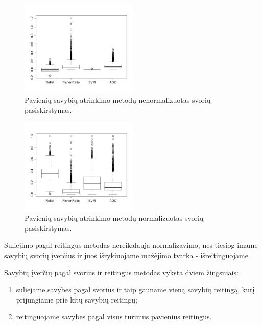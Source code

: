 \begin{figure}[htb]
\begin{center}
\leavevmode
\includegraphics[width=0.5\textwidth]{images/boxplot_colon_all.png}
\end{center}
\caption{Pavienių savybių atrinkimo metodų nenormalizuotas svorių
pasiskirstymas.}
\label{fig:flash}
\end{figure}

\begin{figure}[htb]
\begin{center}
\leavevmode
\includegraphics[width=0.5\textwidth]{images/boxplot_colon_all_normalized.png}
\end{center}
\caption{Pavienių savybių atrinkimo metodų normalizuotas svorių
pasiskirstymas.}
\label{fig:flash}
\end{figure}

Suliejimo pagal reitingus metodas nereikalauja normalizavimo, nes tiesiog imame
savybių svorių įverčius ir juos išrykiuojame mažėjimo tvarka - išreitinguojame.

Savybių įverčių pagal svorius ir reitingus metodas vyksta dviem žingsniais:
\begin{enumerate}
  \item suliejame savybes pagal svorius ir taip gauname vieną savybių reitingą,
  kurį prijungiame prie kitų savybių reitingų;
  \item reitinguojame savybes pagal visus turimus pavienius reitingus.
\end{enumerate} 
